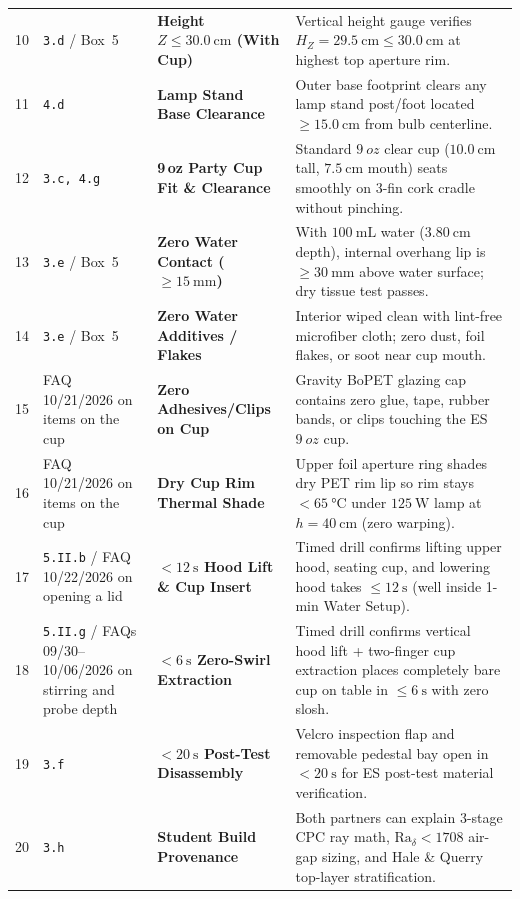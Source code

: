 \begin{center}
\begin{tabularx}{\linewidth}{@{}cll>{\raggedright\arraybackslash}X@{}}
\rowcolor{rowalt}10 & \texttt{3.d} / Box~5 & \textbf{Height $Z \le \SI{30.0}{\centi\meter}$ (With Cup)} & Vertical height gauge verifies $H_Z = \SI{29.5}{\centi\meter} \le \SI{30.0}{\centi\meter}$ at highest top aperture rim. \\
11 & \texttt{4.d} & \textbf{Lamp Stand Base Clearance} & Outer base footprint clears any lamp stand post/foot located $\ge\SI{15.0}{\centi\meter}$ from bulb centerline. \\
\rowcolor{rowalt}12 & \texttt{3.c, 4.g} & \textbf{9\,oz Party Cup Fit \& Clearance} & Standard $\SI{9}{oz}$ clear cup ($\SI{10.0}{\centi\meter}$ tall, $\SI{7.5}{\centi\meter}$ mouth) seats smoothly on 3-fin cork cradle without pinching. \\
13 & \texttt{3.e} / Box~5 & \textbf{Zero Water Contact ($\ge\SI{15}{\milli\meter}$)} & With $\SI{100}{\milli\liter}$ water ($\SI{3.80}{\centi\meter}$ depth), internal overhang lip is $\ge\SI{30}{\milli\meter}$ above water surface; dry tissue test passes. \\
\rowcolor{rowalt}14 & \texttt{3.e} / Box~5 & \textbf{Zero Water Additives / Flakes} & Interior wiped clean with lint-free microfiber cloth; zero dust, foil flakes, or soot near cup mouth. \\
15 & FAQ 10/21/2026 on items on the cup & \textbf{Zero Adhesives/Clips on Cup} & Gravity BoPET glazing cap contains zero glue, tape, rubber bands, or clips touching the ES $\SI{9}{oz}$ cup. \\
\rowcolor{rowalt}16 & FAQ 10/21/2026 on items on the cup & \textbf{Dry Cup Rim Thermal Shade} & Upper foil aperture ring shades dry PET rim lip so rim stays $<\SI{65}{\celsius}$ under $\SI{125}{\watt}$ lamp at $h=\SI{40}{\centi\meter}$ (zero warping). \\
17 & \texttt{5.II.b} / FAQ 10/22/2026 on opening a lid & \textbf{$<\SI{12}{\second}$ Hood Lift \& Cup Insert} & Timed drill confirms lifting upper hood, seating cup, and lowering hood takes $\le\SI{12}{\second}$ (well inside 1-min Water Setup). \\
\rowcolor{rowalt}18 & \texttt{5.II.g} / FAQs 09/30--10/06/2026 on stirring and probe depth & \textbf{$<\SI{6}{\second}$ Zero-Swirl Extraction} & Timed drill confirms vertical hood lift + two-finger cup extraction places completely bare cup on table in $\le\SI{6}{\second}$ with zero slosh. \\
19 & \texttt{3.f} & \textbf{$<\SI{20}{\second}$ Post-Test Disassembly} & Velcro inspection flap and removable pedestal bay open in $<\SI{20}{\second}$ for ES post-test material verification. \\
\rowcolor{rowalt}20 & \texttt{3.h} & \textbf{Student Build Provenance} & Both partners can explain 3-stage CPC ray math, $\mathrm{Ra}_\delta < 1708$ air-gap sizing, and Hale \& Querry top-layer stratification. \\
\bottomrule
\end{tabularx}
\end{center}

